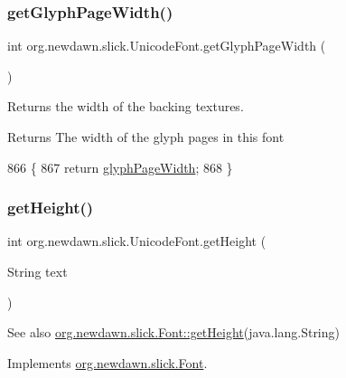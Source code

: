 \subsubsection{\texorpdfstring{get\+Glyph\+Page\+Width()}{getGlyphPageWidth()}}
{\footnotesize\ttfamily int org.\+newdawn.\+slick.\+Unicode\+Font.\+get\+Glyph\+Page\+Width (\begin{DoxyParamCaption}{ }\end{DoxyParamCaption})\hspace{0.3cm}{\ttfamily [inline]}}

Returns the width of the backing textures.

\begin{DoxyReturn}{Returns}
The width of the glyph pages in this font 
\end{DoxyReturn}

\begin{DoxyCode}
866                                     \{
867         \textcolor{keywordflow}{return} \mbox{\hyperlink{classorg_1_1newdawn_1_1slick_1_1_unicode_font_a3fe610a3c34ca1aa69a118601e8cb2bc}{glyphPageWidth}};
868     \}
\end{DoxyCode}
\mbox{\label{classorg_1_1newdawn_1_1slick_1_1_unicode_font_a409f20ee363890da63571bbc46567808}} 
\subsubsection{\texorpdfstring{get\+Height()}{getHeight()}}
{\footnotesize\ttfamily int org.\+newdawn.\+slick.\+Unicode\+Font.\+get\+Height (\begin{DoxyParamCaption}\item[{String}]{text }\end{DoxyParamCaption})\hspace{0.3cm}{\ttfamily [inline]}}

\begin{DoxySeeAlso}{See also}
\mbox{\hyperlink{interfaceorg_1_1newdawn_1_1slick_1_1_font_ac6a8b604bee484ad3ac2dd57a3eb65c9}{org.\+newdawn.\+slick.\+Font\+::get\+Height}}(java.\+lang.\+String) 
\end{DoxySeeAlso}


Implements \mbox{\hyperlink{interfaceorg_1_1newdawn_1_1slick_1_1_font_ac6a8b604bee484ad3ac2dd57a3eb65c9}{org.\+newdawn.\+slick.\+Font}}.


